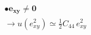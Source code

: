 \documentclass[preview]{standalone}
\begin{document}
\begin{align*}
&\boldsymbol{ \bullet e_{xy} \neq 0 }\\
            & \rightarrow u(e_{xy}^2) \simeq \frac{1}{2}C_{44}\,e_{xy}^2
\end{align*}
\end{document}
